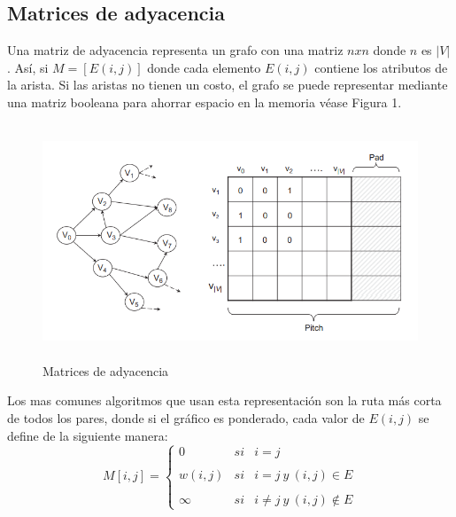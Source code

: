 \documentclass[12pt,twoside]{article}
\begin{document}
    \subsection{Matrices de adyacencia}
        Una matriz de adyacencia representa un grafo con una matriz $nxn$ donde $n$ es $|V|$. As\'i, si $M=[E(i,j)]$ donde cada elemento $E(i,j)$ contiene los atributos de la arista. Si las aristas no tienen un costo, el grafo se puede representar mediante una matriz booleana para ahorrar espacio en la memoria v\'ease Figura 1.
        \begin{figure}[H]
            \centering
            \includegraphics[height=7cm]{imagenes/c1.png}
            \caption{Matrices de adyacencia}
        \end{figure}
        Los mas comunes algoritmos que usan esta representación son la ruta más corta de todos los pares, donde si el gráfico es ponderado, cada valor de $E(i,j)$ se define de la siguiente manera:\\
        $$M[i,j]= \left\{ \begin{array}{lcc}
            0 &   si  & i=j\\
            \\ w(i,j) &  si & i=j~y~(i,j)\in E\\
            \\ \infty &  si & i\neq j~y~(i,j)\notin E
            \end{array}
            \right.$$
        \\
\end{document}
